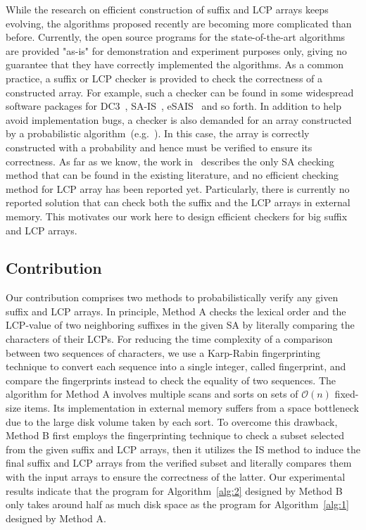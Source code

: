 \documentclass[10pt,journal,compsoc]{IEEEtran}
\begin{document}
While the research on efficient construction of suffix and LCP arrays keeps evolving, the algorithms proposed recently are becoming more complicated than before. Currently, the open source programs for the state-of-the-art algorithms are provided "as-is" for demonstration and experiment purposes only, giving no guarantee that they have correctly implemented the algorithms. As a common practice, a suffix or LCP checker is provided to check the correctness of a constructed array. For example, such a checker can be found in some widespread software packages for DC3~\cite{Dementiev08}, SA-IS~\cite{Nong11}, eSAIS~\cite{Bingmann12} and so forth. In addition to help avoid implementation bugs, a checker is also demanded for an array constructed by a probabilistic algorithm~(e.g.~\cite{Bille2013}). In this case, the array is correctly constructed with a probability and hence must be verified to ensure its correctness. As far as we know, the work in~\cite{Burkhardt2003} describes the only SA checking method that can be found in the existing literature, and no efficient checking method for LCP array has been reported yet. Particularly, there is currently no reported solution that can check both the suffix and the LCP arrays in external memory. This motivates our work here to design efficient checkers for big suffix and LCP arrays.  

	
\subsection{Contribution}\label{sec:introduction:contribution}

Our contribution comprises two methods to probabilistically verify any given suffix and LCP arrays. In principle, Method A checks the lexical order and the LCP-value of two neighboring suffixes in the given SA by literally comparing the characters of their LCPs. For reducing the time complexity of a comparison between two sequences of characters, we use a Karp-Rabin fingerprinting technique to convert each sequence into a single integer, called fingerprint, and compare the fingerprints instead to check the equality of two sequences. The algorithm for Method A involves multiple scans and sorts on sets of $\mathcal{O}(n)$ fixed-size items. Its implementation in external memory suffers from a space bottleneck due to the large disk volume taken by each sort. 
To overcome this drawback, Method B first employs the fingerprinting technique to check a subset selected from the given suffix and LCP arrays, then it utilizes the IS method to induce the final suffix and LCP arrays from the verified subset and literally compares them with the input arrays to ensure the correctness of the latter. Our experimental results indicate that the program for Algorithm~\ref{alg:2} designed by Method B only takes around half as much disk space as the program for Algorithm~\ref{alg:1} designed by Method A.
\end{document}
